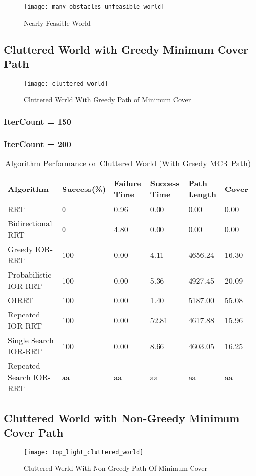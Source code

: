 \begin{figure}[h]
    \centering
    \texttt{[image: many\_obstacles\_unfeasible\_world]}
    \caption{Nearly Feasible World}
    \label{fig:many_obstacles_unfeasible_world}
\end{figure}

\subsection{Cluttered World with Greedy Minimum Cover Path}
\begin{figure}[h]
    \centering
    \texttt{[image: cluttered\_world]}
    \caption{Cluttered World With Greedy Path of Minimum Cover}
    \label{fig:cluttered_world}
\end{figure}
\subsubsection{IterCount = 150}
\subsubsection{IterCount = 200}
\begin{table}
\begin{tabular}{@{}llllll@{}}
\toprule
Algorithm & Success(\%)  & Failure Time  & Success Time  & Path Length & Cover\\ 
\midrule
RRT & 0 & 0.96 & 0.00 & 0.00 & 0.00 \\
Bidirectional RRT & 0 & 4.80 & 0.00 & 0.00 & 0.00 \\
Greedy IOR-RRT & 100 & 0.00 & 4.11 & 4656.24 & 16.30 \\
Probabilistic IOR-RRT & 100 & 0.00 & 5.36 & 4927.45 & 20.09 \\
OIRRT & 100 & 0.00 & 1.40 & 5187.00 & 55.08 \\
Repeated IOR-RRT & 100 & 0.00 & 52.81 & 4617.88 & 15.96 \\
Single Search IOR-RRT & 100 & 0.00 & 8.66 & 4603.05 & 16.25 \\
Repeated Search IOR-RRT & aa & aa & aa & aa & aa \\
\bottomrule
\end{tabular}
\caption{Algorithm Performance on Cluttered World (With Greedy MCR Path)}
\label{tab:cluttered_world}
\end{table}


\subsection{Cluttered World with Non-Greedy Minimum Cover Path}
\begin{figure}[h]
    \centering
    \texttt{[image: top\_light\_cluttered\_world]}
    \caption{Cluttered World With Non-Greedy Path Of Minimum Cover}
    \label{fig:top_light_cluttered_world}
\end{figure}
